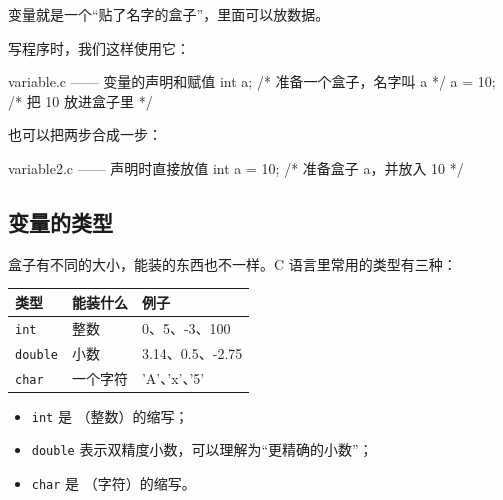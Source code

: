 变量就是一个“贴了名字的盒子”，里面可以放数据。

\begin{center}
\end{center}

写程序时，我们这样使用它：

\begin{codebox}{variable.c —— 变量的声明和赋值}
int a;          /* 准备一个盒子，名字叫 a */
a = 10;         /* 把 10 放进盒子里 */
\end{codebox}

也可以把两步合成一步：

\begin{codebox}{variable2.c —— 声明时直接放值}
int a = 10;     /* 准备盒子 a，并放入 10 */
\end{codebox}

\subsection{变量的类型}

盒子有不同的大小，能装的东西也不一样。C 语言里常用的类型有三种：

\begin{center}
\begin{tabular}{@{}lll@{}}
\toprule
类型 & 能装什么 & 例子 \\
\midrule
\texttt{int} & 整数 & 0、5、-3、100 \\
\texttt{double} & 小数 & 3.14、0.5、-2.75 \\
\texttt{char} & 一个字符 & 'A'、'x'、'5' \\
\bottomrule
\end{tabular}
\end{center}

\begin{itemize}
  \item \texttt{int} 是 （整数）的缩写；
  \item \texttt{double} 表示双精度小数，可以理解为“更精确的小数”；
  \item \texttt{char} 是 （字符）的缩写。
\end{itemize}

